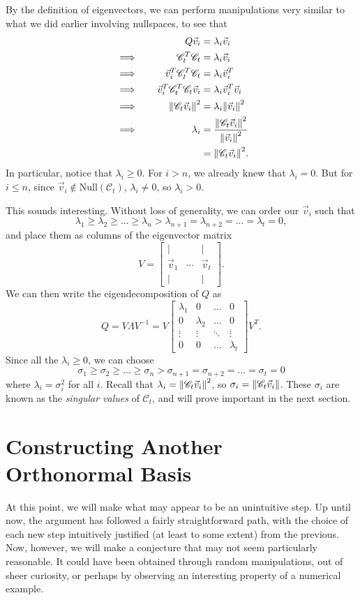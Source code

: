 \documentclass[letterpaper]{article}
\theoremstyle{remark}
\newcommand{\Null}[1]{\text{Null}(#1)}
\newcommand{\mat}[1]{\ensuremath{\begin{bmatrix}#1\end{bmatrix}}}
\newcommand{\eqn}[1]{\begin{alignat*}{2}#1\end{alignat*}}
\newcommand*{\thus}{&\implies\quad&}
\begin{document}
By the definition of eigenvectors, we can perform manipulations very similar to what we did earlier involving nullspaces, to see that
\eqn{
    && Q \vec{v}_i &= \lambda_i \vec{v}_i \\
    \thus \mathscr{C}_t^T\mathscr{C}_t &= \lambda_i\vec{v}_i \\
    \thus \vec{v}_i^T\mathscr{C}_t^T\mathscr{C}_t &= \lambda_i \vec{v}_i^T \\
    \thus \vec{v}_i^T\mathscr{C}_t^T\mathscr{C}_t\vec{v}_i &= \lambda_i \vec{v}_i^T\vec{v}_i \\
    \thus \norm{\mathscr{C}_t\vec{v}_i}^2 &= \lambda_i \norm{\vec{v}_i}^2 \\
    \thus \lambda_i &= \frac{\norm{\mathscr{C}_t\vec{v}_i}^2}{\norm{\vec{v}_i}^2} \\ 
    &&&= \norm{\mathscr{C}_t\vec{v}_i}^2.
}
In particular, notice that $\lambda_i \ge 0$. For $i > n$, we already knew that $\lambda_i = 0$. But for $i \le n$, since $\vec{v}_i \not\in \Null{\mathscr{C}_t}$, $\lambda_i \ne 0$, so $\lambda_i > 0$.

This sounds interesting. Without loss of generality, we can order our $\vec{v}_i$ such that
\[
    \lambda_1 \ge \lambda_2 \ge \ldots \ge \lambda_n > \lambda_{n + 1} = \lambda_{n + 2} = \ldots = \lambda_t = 0,
\]
and place them as columns of the eigenvector matrix
\[
    V = \mat{| & & | \\ \vec{v}_1 & \cdots & \vec{v}_t \\ | & & |}.
\]
We can then write the eigendecomposition of $Q$ as
\[
    Q = V\Lambda V^{-1} = V\mat{\lambda_1 & 0 & \ldots &  0 \\ 0 & \lambda_2 & \ldots & 0 \\ \vdots & \vdots & \ddots & \vdots \\ 0 & 0 & \ldots & \lambda_t}V^T.
\]
Since all the $\lambda_i \ge 0$, we can choose
\[
    \sigma_1 \ge \sigma_2 \ge \ldots \ge \sigma_n > \sigma_{n + 1} = \sigma_{n + 2} = \ldots = \sigma_t = 0
\]
where $\lambda_i = \sigma_i^2$ for all $i$. Recall that $\lambda_i = \norm{\mathscr{C}_t\vec{v}_i}^2$, so $\sigma_i = \norm{\mathscr{C}_t\vec{v}_i}$. These $\sigma_i$ are known as the \emph{singular values} of $\mathscr{C}_t$, and will prove important in the next section.

\section{Constructing Another Orthonormal Basis}
At this point, we will make what may appear to be an unintuitive step. Up until now, the argument has followed a fairly straightforward path, with the choice of each new step intuitively justified (at least to some extent) from the previous. Now, however, we will make a conjecture that may not seem particularly reasonable. It could have been obtained through random manipulations, out of sheer curiosity, or perhaps by observing an interesting property of a numerical example.
\end{document}
